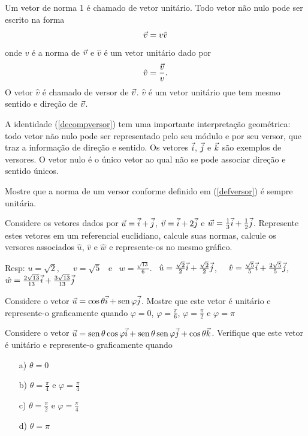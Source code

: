 Um vetor de norma 1 é chamado de vetor unitário. Todo vetor não nulo pode ser escrito na forma
\begin{equation}\label{decompversor}\vec{v}=v \hat{v}\end{equation}
onde $v$ é a norma de $\vec{v}$ e $\hat{v}$ é um vetor unitário dado por
\begin{equation}\label{defversor}\hat{v}=\frac{\vec{v}}{v}.\end{equation}
O vetor $\hat{v}$ é chamado de versor de $\vec{v}$. $\hat{v}$ é um vetor unitário que tem mesmo sentido e direção de $\vec{v}$.

A identidade (\ref{decompversor}) tem uma importante interpretação geométrica: todo vetor não nulo pode ser representado pelo seu módulo e por seu versor, que traz a informação de direção e sentido.  Os vetores $\vec{i}$, $\vec{j}$ e $\vec{k}$ são exemplos de versores. O vetor nulo é o único vetor ao qual não se pode associar direção e sentido únicos.


\begin{prob}Mostre que a norma de um versor conforme definido em (\ref{defversor}) é sempre unitária. 
\end{prob}

\begin{prob}\label{ex1uvw} Considere os vetores dados por $\vec{u}=\vec{i}+\vec{j}$, $\vec{v}=\vec{i}+2\vec{j}$ e $\vec{w}=\frac{1}{3}\vec{i}+\frac{1}{2}\vec{j}$. Represente estes vetores em um referencial euclidiano, calcule suas normas, calcule os versores associados $\hat{u}$, $\hat{v}$ e $\hat{w}$ e represente-os no mesmo gráfico.  
\end{prob}
Resp: $u=\sqrt{2}$, ~~ $v=\sqrt{5}$ ~e~ $w=\frac{\sqrt{13}}{{6}}$.~ $\hat{u}=\frac{\sqrt{2}}{2}\vec{i}+\frac{\sqrt{2}}{2}\vec{j}$,~~  $\hat{v}=\frac{\sqrt{5}}{5}\vec{i}+\frac{2\sqrt{5}}{5}\vec{j}$,~~ $\hat{w}=\frac{2\sqrt{13}}{13}\vec{i}+\frac{3\sqrt{13}}{13}\vec{j}$

\begin{prob} Considere o vetor $\vec{u}=\cos\theta \vec{i}+ \operatorname{sen}\varphi \vec{j}$. Mostre que este vetor é unitário e represente-o graficamente quando $\varphi=0$, $\varphi=\frac{\pi}{6}$, $\varphi=\frac{\pi}{2}$ e $\varphi={\pi}$ 
\end{prob}

\begin{prob} Considere o vetor $\vec{u}=\operatorname{sen}\theta \cos\varphi \vec{i}+ \operatorname{sen}\theta \operatorname{sen}\varphi \vec{j} + \cos\theta \vec{k}$. Verifique que este vetor é unitário e represente-o graficamente quando
\begin{itemize}
\item[a)] $\theta=0$
\item[b)] $\theta=\frac{\pi}{4}$ e $\varphi=\frac{\pi}{4}$
\item[c)] $\theta=\frac{\pi}{2}$ e $\varphi=\frac{\pi}{4}$
\item[d)] $\theta=\pi$

\end{itemize}
\end{prob}

